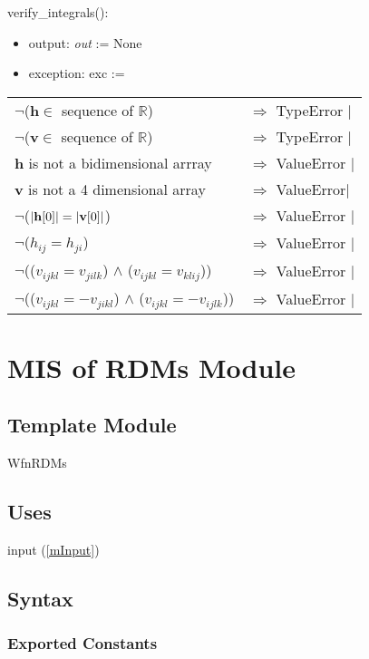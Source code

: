 \documentclass[12pt, titlepage]{article}
\begin{document}
\noindent verify\_integrals():
\begin{itemize}
	\item output: \textit{out} := None
	\item exception: exc := 
\end{itemize}
\noindent \begin{longtable*}[l]{l l}
	$\neg$(\textbf{h}$\in$ sequence of $\mathbb{R}$) & $\Rightarrow$ TypeError 
	$\vert$\\
	$\neg$(\textbf{v}$\in$ sequence of $\mathbb{R}$) & $\Rightarrow$ 
	TypeError $\vert$\\
	\textbf{h} is not a bidimensional arrray  & $\Rightarrow$ 
	ValueError $\vert$\\
	\textbf{v} is not a 4 dimensional array& $\Rightarrow$ ValueError$\vert$\\
	$\neg$($|\bold{h}[0]| = |\bold{v}[0]|$) & $\Rightarrow$ 
	ValueError $\vert$\\
	$\neg$($h_{ij} = h_{ji}$) & $\Rightarrow$ 
	ValueError $\vert$\\
	$\neg$(($v_{ijkl} = v_{jilk}$) $\land$ ($v_{ijkl} = v_{klij}$)) & 
	$\Rightarrow$ 
	ValueError $\vert$\\
	$\neg$(($v_{ijkl} = -v_{jikl}$) $\land$ ($v_{ijkl} = -v_{ijlk}$)) & 
	$\Rightarrow$ 
	ValueError $\vert$\\
\end{longtable*}

\newpage

\section{MIS of RDMs Module} \label{mRDMs}

\subsection{Template Module}

WfnRDMs

\subsection{Uses}
input (\ref{mInput})

\subsection{Syntax}

\subsubsection{Exported Constants}
\end{document}
